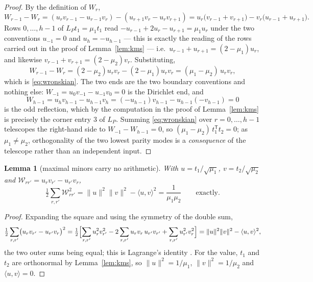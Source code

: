 \documentclass[11pt,a4paper]{article}
\theoremstyle{plain}
\newtheorem{lemma}[theorem]{Lemma}
\theoremstyle{definition}
\newcommand{\T}{\mathsf{T}}
\begin{document}
\begin{proof}
By the definition of $W_r$,
\[
  W_{r-1}-W_r=(u_rv_{r-1}-u_{r-1}v_r)-(u_{r+1}v_r-u_rv_{r+1})
  =u_r\bigl(v_{r-1}+v_{r+1}\bigr)-v_r\bigl(u_{r-1}+u_{r+1}\bigr).
\]
Rows $0,\dots,h-1$ of $L_Pt_1=\mu_1t_1$ read
$-u_{r-1}+2u_r-u_{r+1}=\mu_1u_r$ under the two conventions $u_{-1}=0$ and
$u_h=-u_{h-1}$ --- this is exactly the reading of the rows carried out in the
proof of Lemma~\ref{lem:kms} --- i.e.\ $u_{r-1}+u_{r+1}=(2-\mu_1)u_r$, and
likewise $v_{r-1}+v_{r+1}=(2-\mu_2)v_r$. Substituting,
\[
  W_{r-1}-W_r=(2-\mu_2)u_rv_r-(2-\mu_1)u_rv_r=(\mu_1-\mu_2)\,u_rv_r ,
\]
which is \eqref{eq:wronskian}. The two ends are the two boundary conventions
and nothing else: $W_{-1}=u_0v_{-1}-u_{-1}v_0=0$ is the Dirichlet end, and
\[
  W_{h-1}=u_hv_{h-1}-u_{h-1}v_h
  =(-u_{h-1})v_{h-1}-u_{h-1}(-v_{h-1})=0
\]
is the odd reflection, which by the computation in the proof of
Lemma~\ref{lem:kms} is precisely the corner entry $3$ of $L_P$. Summing
\eqref{eq:wronskian} over $r=0,\dots,h-1$ telescopes the right-hand side to
$W_{-1}-W_{h-1}=0$, so $(\mu_1-\mu_2)\,t_1^{\T}t_2=0$; as $\mu_1\ne\mu_2$,
orthogonality of the two lowest parity modes is a \emph{consequence} of the
telescope rather than an independent input.
\end{proof}

\begin{lemma}[maximal minors carry no arithmetic]
\label{lem:minors}
With $u=t_1/\sqrt{\mu_1}$, $v=t_2/\sqrt{\mu_2}$ and
$\mathcal W_{rr'}=u_rv_{r'}-u_{r'}v_r$,
\begin{equation}
\label{eq:lagrange}
  \tfrac12\sum_{r,r'}\mathcal W_{rr'}^{2}
  =\lVert u\rVert^{2}\lVert v\rVert^{2}-\langle u,v\rangle^{2}
  =\frac1{\mu_1\mu_2}
  \qquad\text{exactly}.
\end{equation}
\end{lemma}

\begin{proof}
Expanding the square and using the symmetry of the double sum,
\[
  \tfrac12\sum_{r,r'}\bigl(u_rv_{r'}-u_{r'}v_r\bigr)^{2}
  =\tfrac12\Bigl[\sum_{r,r'}u_r^{2}v_{r'}^{2}
    -2\sum_{r,r'}u_rv_r\,u_{r'}v_{r'}
    +\sum_{r,r'}u_{r'}^{2}v_r^{2}\Bigr]
  =\lVert u\rVert^{2}\lVert v\rVert^{2}-\langle u,v\rangle^{2},
\]
the two outer sums being equal; this is Lagrange's identity
\cite{Lagrange1773}. For the value, $t_1$ and $t_2$ are orthonormal by
Lemma~\ref{lem:kms}, so $\lVert u\rVert^{2}=1/\mu_1$,
$\lVert v\rVert^{2}=1/\mu_2$ and $\langle u,v\rangle=0$.
\end{proof}
\end{document}
